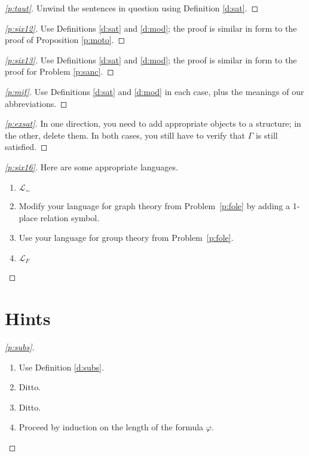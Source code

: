 \documentclass[12pt]{amsbook}
\theoremstyle{plain}
\theoremstyle{definition}
\theoremstyle{remark}
\newenvironment{clue}[1]%
{\begin{proof}[\ref{#1}]}%
{\renewcommand{\qed}{}\end{proof}}
\begin{document}
\begin{clue}{p:taut}
Unwind the sentences in question using Definition \ref{d:sat}.
\end{clue}

\begin{clue}{p:six12}
Use Definitions \ref{d:sat} and \ref{d:mod};  the proof is similar in form to the proof of Proposition \ref{p:moto}.
\end{clue}

\begin{clue}{p:six13}
Use Definitions \ref{d:sat} and \ref{d:mod};  the proof is similar in form to the proof for Problem \ref{p:sanc}.
\end{clue}

\begin{clue}{p:mif}
Use Definitions \ref{d:sat} and \ref{d:mod} in each case,  plus the meanings of our abbreviations.
\end{clue}

\begin{clue}{p:exsat}
In one direction,  you need to add appropriate objects to a structure;  in the other,  delete them.  In both cases,  you still have to verify that $\Gamma$ is still satisfied.
\end{clue}

\begin{clue}{p:six16}
Here are some appropriate languages.
\begin{enumerate}
\item $\mathcal{L}_=$
\item Modify your language for graph theory from Problem~\ref{p:fole} by adding a 1-place relation symbol.
\item Use your language for group theory from Problem~\ref{p:fole}.
\item $\mathcal{L}_F$
\end{enumerate}
\end{clue}


%
%

\chapter{Hints}


\begin{clue}{p:subs}
\begin{enumerate}
\item Use Definition \ref{d:subs}.
\item Ditto.
\item Ditto.
\item Proceed by induction on the length of the formula $\varphi$.
\end{enumerate}
\end{clue}
\end{document}
